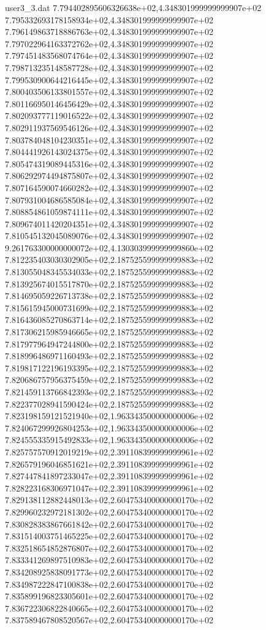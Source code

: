 \begin{filecontents}{user3_3.dat}
7.794402895606326638e+02,4.348301999999999907e+02
7.795332693178158934e+02,4.348301999999999907e+02
7.796149863718886763e+02,4.348301999999999907e+02
7.797022964163372762e+02,4.348301999999999907e+02
7.797451483568074764e+02,4.348301999999999907e+02
7.798713235148587728e+02,4.348301999999999907e+02
7.799530900644216445e+02,4.348301999999999907e+02
7.800403506133801557e+02,4.348301999999999907e+02
7.801166950146456429e+02,4.348301999999999907e+02
7.802093777119016522e+02,4.348301999999999907e+02
7.802911937569546126e+02,4.348301999999999907e+02
7.803784048104230351e+02,4.348301999999999907e+02
7.804441926143024375e+02,4.348301999999999907e+02
7.805474319089445316e+02,4.348301999999999907e+02
7.806292974494875807e+02,4.348301999999999907e+02
7.807164590074660282e+02,4.348301999999999907e+02
7.807931004686585084e+02,4.348301999999999907e+02
7.808854861059874111e+02,4.348301999999999907e+02
7.809674011420204351e+02,4.348301999999999907e+02
7.810545132045089076e+02,4.348301999999999907e+02
9.261763300000000072e+02,4.130303999999999860e+02
7.812235403030302905e+02,2.187525599999999883e+02
7.813055048345534033e+02,2.187525599999999883e+02
7.813925674015517870e+02,2.187525599999999883e+02
7.814695059226713738e+02,2.187525599999999883e+02
7.815615945000731699e+02,2.187525599999999883e+02
7.816436085270863714e+02,2.187525599999999883e+02
7.817306215985946665e+02,2.187525599999999883e+02
7.817977964947244800e+02,2.187525599999999883e+02
7.818996486971160493e+02,2.187525599999999883e+02
7.819817122196193395e+02,2.187525599999999883e+02
7.820686757956375459e+02,2.187525599999999883e+02
7.821459113766842393e+02,2.187525599999999883e+02
7.822377028941590424e+02,2.187525599999999883e+02
7.823198159121521940e+02,1.963343500000000006e+02
7.824067299926804253e+02,1.963343500000000006e+02
7.824555335915492833e+02,1.963343500000000006e+02
7.825757570912019219e+02,2.391108399999999961e+02
7.826579196046851621e+02,2.391108399999999961e+02
7.827447841897233047e+02,2.391108399999999961e+02
7.828223168306971047e+02,2.391108399999999961e+02
7.829138112882448013e+02,2.604753400000000170e+02
7.829960232972181302e+02,2.604753400000000170e+02
7.830828383867661842e+02,2.604753400000000170e+02
7.831514003751465225e+02,2.604753400000000170e+02
7.832518654852876807e+02,2.604753400000000170e+02
7.833341269897510983e+02,2.604753400000000170e+02
7.834208925838091773e+02,2.604753400000000170e+02
7.834987222847100838e+02,2.604753400000000170e+02
7.835899196823305601e+02,2.604753400000000170e+02
7.836722306822840665e+02,2.604753400000000170e+02
7.837589467808520567e+02,2.604753400000000170e+02

\end{filecontents}
